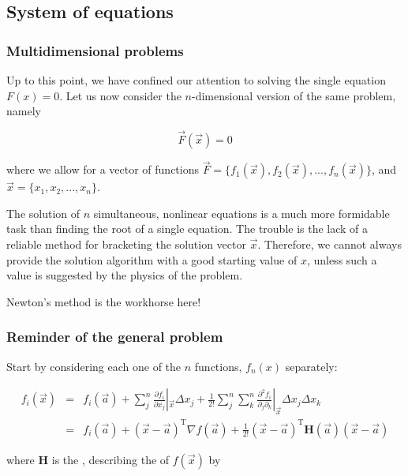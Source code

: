 \documentclass[hyperref={colorlinks=true}]{beamer}
\begin{document}
\subsection[System of equations]{System of equations}

\begin{frame}%
  \frametitle{Multidimensional problems}

  Up to this point, we have confined our attention to solving the single equation $F(x) = 0$. Let us now consider the $n$-dimensional version of the same problem, namely
  
  \begin{equation}
    \vec{F}(\vec{x}) = 0
  \end{equation}

  where we allow for a vector of functions $\vec{F} = \{f_1(\vec{x}), f_2(\vec{x}), ..., f_n(\vec{x})\}$, and $\vec{x} = \{ x_1, x_2, ..., x_{n} \}$.
  
  \mysp
  
  The solution of $n$ simultaneous, nonlinear equations is a much more formidable task than finding the root of a single equation. The trouble is the lack of a reliable method for bracketing the solution vector $\vec{x}$. Therefore, we cannot always provide the solution algorithm with a good starting value of $x$, unless such a value is suggested by the physics of the problem.
  
  \mysp
  
  Newton's method is the workhorse here!
  

\end{frame}


\begin{frame}%
  \frametitle{Reminder of the general problem}

  Start by considering each one of the $n$ functions, $f_n(x)$ separately:

  \begin{eqnarray}
    f_i(\vec{x}) &=& f_i(\vec{a} )+ \sum_j^n \frac{\partial f_i}{\partial x_j}|_{\vec{x}} \Delta x_j + \frac{1}{2!} \sum_j^n \sum_k^n \frac{\partial^2 f_i}{\partial_j \partial_k}|_{\vec{x}} \Delta x_j \Delta x_k \\
                 &=& f_i(\vec {a} )+ (\vec{x} - \vec{a})^{\mathrm {T} }  \nabla f(\vec{a}) + \frac{1}{2!}(\vec{x} - \vec{a})^{\mathrm {T} }\mathbf {H} (\vec{a})(\vec{x} - \vec{a})
  \end{eqnarray}
  
  where $\mathbf {H}$ is the , describing the  of $f(\vec{x})$ by

\end{frame}
\end{document}
